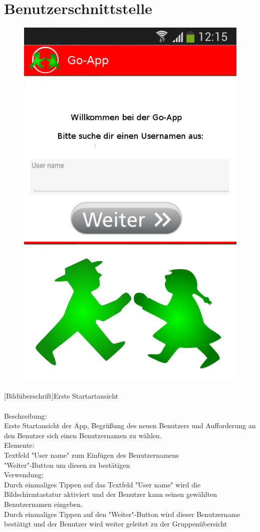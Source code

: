 \section{Benutzerschnittstelle}
\begin{figure} 
\includegraphics[scale =1]{resources/images/startansicht.png}
\end{figure}
[Bildüberschrift]Erste Startartansicht\\ \\
[Kleinüberschrift]Beschreibung:\\
Erste Startansicht der App, Begrüßung des neuen Benutzers und Aufforderung an den Benutzer sich einen Benutzernamen zu wählen.\\
[Kleinüberschrift]Elemente:\\
Textfeld "User name" zum Einfügen des Benutzernamens\\
"Weiter"-Button um diesen zu bestätigen\\
[Kleinüberschrift]Verwendung:\\
Durch einmaliges Tippen auf das Textfeld "User name" wird die Bildschirmtastatur aktiviert und der Benutzer kann seinen gewählten Benutzernamen eingeben.\\
Durch einmaliges Tippen auf den "Weiter"-Button wird dieser Benutzername bestätigt und der Benutzer wird weiter geleitet zu der Gruppenübersicht\\ \\

